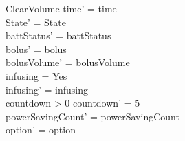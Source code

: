 \begin{schema}{ClearVolume}
	time' = time\\ State' = State\\
	battStatus' = battStatus\\
	bolus' = bolus\\
	bolusVolume' = bolusVolume\\
	infusing = Yes\\
	infusing' = infusing\\
	countdown > 0 \land countdown' = 5\\
	powerSavingCount' = powerSavingCount\\ option' = option\\
\end{schema}

